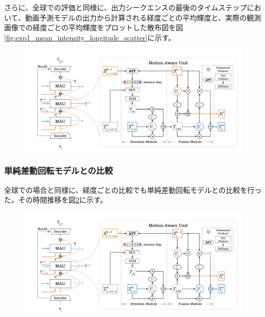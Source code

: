           さらに、全球での評価と同様に、出力シークエンスの最後のタイムステップにおいて、動画予測モデルの出力から計算される経度ごとの平均輝度と、実際の観測画像での経度ごとの平均輝度をプロットした散布図を図\ref{fig:exp1_mean_intensity_longitude_scatter}に示す。
          
          \begin{figure}[h]
            \centering
            \includegraphics[width=\textwidth]{figures/mau.png}
            \caption{}
            \label{fig:exp2_mean_intensity_longitude_scatter}
          \end{figure}

        \subsubsection{単純差動回転モデルとの比較}
          全球での場合と同様に、経度ごとの比較でも単純差動回転モデルとの比較を行った。その時間推移を図\ref{fig:exp1_sdr_longitude_line}に示す。
          \begin{figure}[htbp]
            \centering
            \includegraphics[width=\textwidth]{figures/mau.png}
            \caption{}
            \label{fig:exp1_sdr_longitude_line}
          \end{figure}
          
